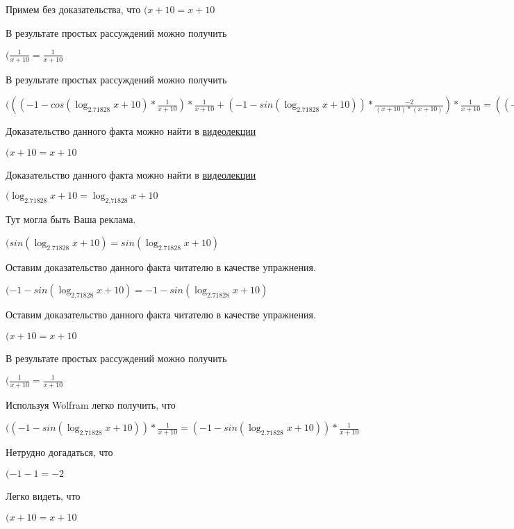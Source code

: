 \documentclass[12pt,a4paper,fleqn]{article}
\theoremstyle{definition}
\begin{document}
Примем без доказательства, что
$( x  +  10  =  x  +  10 $

В результате простых рассуждений можно получить

$(\frac{ 1 }{ x  +  10 }
 = \frac{ 1 }{ x  +  10 }
$

В результате простых рассуждений можно получить

$((( -1  - cos(\log_{ 2.71828 }{ x  +  10 }) * \frac{ 1 }{ x  +  10 }
) * \frac{ 1 }{ x  +  10 }
 + ( -1  - sin(\log_{ 2.71828 }{ x  +  10 })) * \frac{ -2 }{( x  +  10 ) * ( x  +  10 )}
) * \frac{ 1 }{ x  +  10 }
 = (( -1  - cos(\log_{ 2.71828 }{ x  +  10 }) * \frac{ 1 }{ x  +  10 }
) * \frac{ 1 }{ x  +  10 }
 + ( -1  - sin(\log_{ 2.71828 }{ x  +  10 })) * \frac{ -2 }{( x  +  10 ) * ( x  +  10 )}
) * \frac{ 1 }{ x  +  10 }
$

Доказательство данного факта можно найти в \href{https://www.youtube.com/watch?v=dQw4w9WgXcQ}{видеолекции}

$( x  +  10  =  x  +  10 $

Доказательство данного факта можно найти в \href{https://www.youtube.com/watch?v=dQw4w9WgXcQ}{видеолекции}

$(\log_{ 2.71828 }{ x  +  10 } = \log_{ 2.71828 }{ x  +  10 }$

Тут могла быть Ваша реклама.

$(sin(\log_{ 2.71828 }{ x  +  10 }) = sin(\log_{ 2.71828 }{ x  +  10 })$

Оставим доказательство данного факта читателю в качестве упражнения.

$( -1  - sin(\log_{ 2.71828 }{ x  +  10 }) =  -1  - sin(\log_{ 2.71828 }{ x  +  10 })$

Оставим доказательство данного факта читателю в качестве упражнения.

$( x  +  10  =  x  +  10 $

В результате простых рассуждений можно получить

$(\frac{ 1 }{ x  +  10 }
 = \frac{ 1 }{ x  +  10 }
$

Используя Wolfram легко получить, что

$(( -1  - sin(\log_{ 2.71828 }{ x  +  10 })) * \frac{ 1 }{ x  +  10 }
 = ( -1  - sin(\log_{ 2.71828 }{ x  +  10 })) * \frac{ 1 }{ x  +  10 }
$

Нетрудно догадаться, что

$( -1  -  1  =  -2 $

Легко видеть, что

$( x  +  10  =  x  +  10 $
\end{document}
